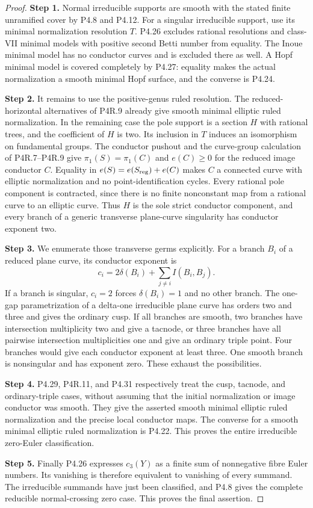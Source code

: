 \begin{proof}
\noindent\textbf{Step 1.} Normal irreducible supports are smooth with the stated finite
unramified cover by P4.8 and P4.12. For a singular irreducible
support, use its minimal normalization resolution $T$.
P4.26 excludes rational resolutions and class-VII minimal
models with positive second Betti number from equality.
The Inoue minimal model has no conductor curves and is
excluded there as well. A Hopf minimal model is covered
completely by P4.27: equality makes the actual normalization
a smooth minimal Hopf surface, and the converse is P4.24.

\noindent\textbf{Step 2.} It remains to use the positive-genus ruled resolution.
The reduced-horizontal alternatives of P4R.9 already give
smooth minimal elliptic ruled normalization. In the remaining
case the pole support is a section $H$ with rational trees,
and the coefficient of $H$ is two. Its inclusion in $T$
induces an isomorphism on fundamental groups. The conductor
pushout and the curve-group calculation of P4R.7--P4R.9 give
$\pi_1(S)=\pi_1(C)$ and $e(C)\ge0$ for the reduced image
conductor $C$. Equality in
$e(S)=e(S_{\rm reg})+e(C)$ makes $C$ a connected curve
with elliptic normalization and no point-identification
cycles. Every rational pole component is contracted, since
there is no finite nonconstant map from a rational curve
to an elliptic curve. Thus $H$ is the sole strict conductor
component, and every branch of a generic transverse
plane-curve singularity has conductor exponent two.

\noindent\textbf{Step 3.} We enumerate those transverse germs explicitly. For a branch
$B_i$ of a reduced plane curve, its conductor exponent is
\[
 c_i=2\delta(B_i)+\sum_{j\ne i}I(B_i,B_j).
\]
If a branch is singular, $c_i=2$ forces
$\delta(B_i)=1$ and no other branch. The one-gap
parametrization of a delta-one irreducible plane curve
has orders two and three and gives the ordinary cusp.
If all branches are smooth, two branches have intersection
multiplicity two and give a tacnode, or three branches
have all pairwise intersection multiplicities one and
give an ordinary triple point. Four branches would give
each conductor exponent at least three. One smooth branch
is nonsingular and has exponent zero. These exhaust the
possibilities.

\noindent\textbf{Step 4.} P4.29, P4R.11, and P4.31 respectively treat the cusp,
tacnode, and ordinary-triple cases, without assuming that
the initial normalization or image conductor was smooth.
They give the asserted smooth minimal elliptic ruled
normalization and the precise local conductor maps.
The converse for a smooth minimal elliptic ruled
normalization is P4.22. This proves the entire irreducible
zero-Euler classification.

\noindent\textbf{Step 5.} Finally P4.26 expresses $c_3(Y)$ as a finite sum of
nonnegative fibre Euler numbers. Its vanishing is therefore
equivalent to vanishing of every summand. The irreducible
summands have just been classified, and P4.8 gives the
complete reducible normal-crossing zero case. This proves
the final assertion.
\end{proof}


